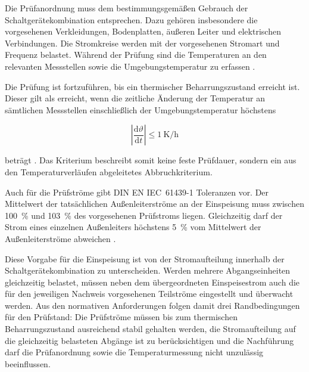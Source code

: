 Die Prüfanordnung muss dem bestimmungsgemäßen Gebrauch der
Schaltgerätekombination entsprechen. Dazu gehören insbesondere die
vorgesehenen Verkleidungen, Bodenplatten, äußeren Leiter und elektrischen
Verbindungen. Die Stromkreise werden mit der vorgesehenen Stromart und
Frequenz belastet. Während der Prüfung sind die Temperaturen an den relevanten
Messstellen sowie die Umgebungstemperatur zu erfassen
\parencite[Abschn.~10.10.2.3.1]{din_en_61439_1}.

Die Prüfung ist fortzuführen, bis ein thermischer Beharrungszustand erreicht
ist. Dieser gilt als erreicht, wenn die zeitliche Änderung der Temperatur an
sämtlichen Messstellen einschließlich der Umgebungstemperatur höchstens

\begin{equation}
  \left|\frac{\mathrm{d}\vartheta}{\mathrm{d}t}\right|
  \leq
  \SI{1}{\kelvin\per\hour}
  \label{eq:beharrungskriterium}
\end{equation}

beträgt
\parencite[Abschn.~10.10.2.3.1]{din_en_61439_1}. Das Kriterium beschreibt
somit keine feste Prüfdauer, sondern ein aus den Temperaturverläufen
abgeleitetes Abbruchkriterium.

Auch für die Prüfströme gibt DIN EN IEC~61439-1 Toleranzen vor. Der Mittelwert
der tatsächlichen Außenleiterströme an der Einspeisung muss zwischen
\SI{100}{\percent} und \SI{103}{\percent} des vorgesehenen Prüfstroms liegen.
Gleichzeitig darf der Strom eines einzelnen Außenleiters höchstens
\SI{5}{\percent} vom Mittelwert der Außenleiterströme abweichen
\parencite[Abschn.~10.10.2.3.1]{din_en_61439_1}.

Diese Vorgabe für die Einspeisung ist von der Stromaufteilung innerhalb der
Schaltgerätekombination zu unterscheiden. Werden mehrere Abgangseinheiten
gleichzeitig belastet, müssen neben dem übergeordneten Einspeisestrom auch die
für den jeweiligen Nachweis vorgesehenen Teilströme eingestellt und überwacht
werden. Aus den normativen Anforderungen folgen damit drei Randbedingungen für
den Prüfstand: Die Prüfströme müssen bis zum thermischen Beharrungszustand
ausreichend stabil gehalten werden, die Stromaufteilung auf die gleichzeitig
belasteten Abgänge ist zu berücksichtigen und die Nachführung darf die
Prüfanordnung sowie die Temperaturmessung nicht unzulässig beeinflussen.



